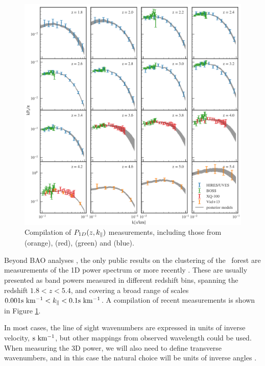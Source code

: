 \begin{figure}[h]
 \begin{center}
  \includegraphics[scale=0.32]{Figures/Walther2018_P1D}
 \end{center}
 \caption{Compilation of $P_{1D}(z,k_\parallel)$ measurements, including those from
  \cite{Viel2013} (orange), \cite{Irsic2017} (red), 
  \cite{Palanque-Delabrouille2013} (green) and \cite{Walther2018a} (blue).
 }
 \label{fig:dataP1D}
\end{figure}

Beyond BAO analyses \cite{Bautista2017,duMasdesBourboux2017}, the only
public results on the clustering of the \lya\ forest are measurements of
the 1D power spectrum \cite{Croft1998,McDonald2000,McDonald2006} or
more recently \cite{Viel2013,Palanque-Delabrouille2013,Irsic2017,Walther2018a}.
These are usually presented as band powers measured in different redshift
bins, spanning the redshift $1.8 < z < 5.4$, and covering a broad range of
scales $0.001 {\rm s~km^{-1}} < k_\parallel < 0.1 {\rm s~km^{-1}}$.
A compilation of recent measurements is shown in Figure \ref{fig:dataP1D}.

In most cases, the line of sight wavenumbers are expressed in units of
inverse velocity, ${\rm s~km^{-1}}$, but other mappings from observed wavelength
could be used.
When measuring the 3D power, we will also need to define transverse
wavenumbers, and in this case the natural choice will be units of
inverse angles \cite{Font-Ribera2018}.

